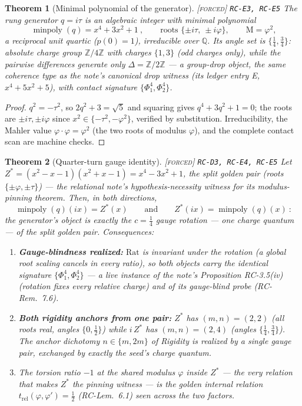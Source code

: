 \documentclass[11pt]{article}
\newcommand{\tagF}{\textcolor{cF}{\textsc{[forced]}}}
\newcommand{\hx}[1]{\textcolor{cC}{\footnotesize\texttt{#1}}}
\newcommand{\Q}{\mathbb{Q}}
\newcommand{\Z}{\mathbb{Z}}
\newcommand{\gp}{\varphi}
\newcommand{\M}{\mathrm{M}}
\theoremstyle{plain}
\newtheorem{theorem}{Theorem}[section]
\theoremstyle{definition}
\theoremstyle{remark}
\begin{document}
\begin{theorem}[Minimal polynomial of the generator]\label{thm:qmin}\tagF{} \hx{RC-E3, RC-E5}
The rung generator $q=i\tau$ is an algebraic integer with minimal polynomial
\[
\boxed{\ \operatorname{minpoly}(q)=x^4+3x^2+1\ },
\qquad\text{roots }\{\pm i\tau,\ \pm i\gp\},\qquad \M=\gp^2 ,
\]
a reciprocal unit quartic ($p(0)=1$), irreducible over $\Q$. Its angle set is
$\{\tfrac14,\tfrac34\}$: absolute charge group $\Z/4\Z$ with charges $\{1,3\}$
(odd charges only), while the pairwise differences generate only
$\Delta=\Z/2\Z$ --- a \emph{group-drop} object, the same coherence type as the
note's canonical drop witness (its ledger entry E, $x^4+5x^2+5$), with contact
signature $\{\Phi_1^{4},\Phi_2^{4}\}$.
\end{theorem}

\begin{proof}
$q^2=-\tau^2$, so $2q^2+3=\sqrt5$ and squaring gives $q^4+3q^2+1=0$; the
roots are $\pm i\tau,\pm i\gp$ since $x^2\in\{-\tau^2,-\gp^2\}$, verified by
substitution. Irreducibility, the Mahler value $\gp\cdot\gp=\gp^2$ (the two
roots of modulus $\gp$), and the complete contact scan are machine checks.
\end{proof}

\begin{theorem}[Quarter-turn gauge identity]\label{thm:gauge}\tagF{} \hx{RC-D3, RC-E4, RC-E5}
Let $Z^{*}=(x^2-x-1)(x^2+x-1)=x^4-3x^2+1$, the split golden pair (roots
$\{\pm\gp,\pm\tau\}$) --- the relational note's hypothesis-necessity witness
for its modulus-pinning theorem. Then, in both directions,
\[
\boxed{\ \operatorname{minpoly}(q)(ix)=Z^{*}(x)
\qquad\text{and}\qquad
Z^{*}(ix)=\operatorname{minpoly}(q)(x)\ }:
\]
the generator's object is \emph{exactly} the $c=\tfrac14$ gauge rotation ---
one charge quantum --- of the split golden pair. Consequences:
\begin{enumerate}[nosep,label=(\alph*)]
\item \textbf{Gauge-blindness realized:} $\mathrm{Rat}$ is invariant under the
rotation (a global root scaling cancels in every ratio), so both objects carry
the identical signature $\{\Phi_1^{4},\Phi_2^{4}\}$ --- a live instance of the
note's Proposition RC-3.5(iv) (rotation fixes every relative charge) and of
its gauge-blind probe (RC-Rem.\ 7.6).
\item \textbf{Both rigidity anchors from one pair:} $Z^{*}$ has
$(m,n)=(2,2)$ (all roots real, angles $\{0,\tfrac12\}$) while $i\,Z^{*}$ has
$(m,n)=(2,4)$ (angles $\{\tfrac14,\tfrac34\}$). The anchor dichotomy
$n\in\{m,2m\}$ of Rigidity is realized by a single gauge pair, exchanged by
exactly the seed's charge quantum.
\item The torsion ratio $-1$ at the shared modulus $\gp$ inside $Z^{*}$ ---
the very relation that makes $Z^{*}$ the pinning witness --- is the golden
internal relation $t_{\mathrm{rel}}(\gp,\gp')=\tfrac12$ (RC-Lem.\ 6.1) seen
across the two factors.
\end{enumerate}
\end{theorem}
\end{document}

